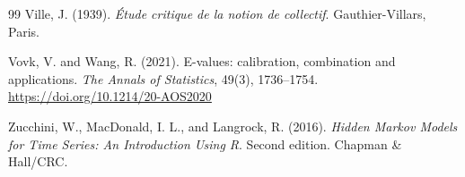 \documentclass[pdflatex,sn-basic]{sn-jnl}
\theoremstyle{thmstyleone}
\theoremstyle{thmstyletwo}
\theoremstyle{thmstylethree}
\newcommand{\1}{\mathbf 1}
\begin{document}
\begin{thebibliography}{99}
Ville, J. (1939).
\emph{{\'E}tude critique de la notion de collectif}.
Gauthier-Villars, Paris.

Vovk, V. and Wang, R. (2021).
E-values: calibration, combination and applications.
\emph{The Annals of Statistics}, 49(3), 1736--1754.
\url{https://doi.org/10.1214/20-AOS2020}

Zucchini, W., MacDonald, I. L., and Langrock, R. (2016).
\emph{Hidden Markov Models for Time Series: An Introduction Using R}.
Second edition. Chapman \& Hall/CRC.

\end{thebibliography}
\end{document}
